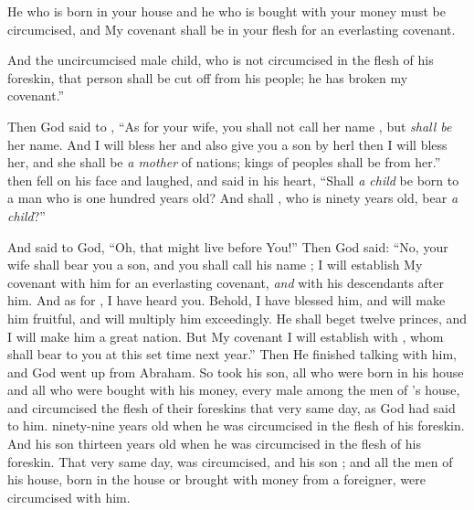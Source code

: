 \bverse He who is born in your house and he who is bought with your money must be circumcised, and My covenant shall be in your flesh for an everlasting covenant.

\bverse And the uncircumcised male child, who is not circumcised in the flesh of his foreskin, that person shall be cut off from his people; he has broken my covenant.''

\bverse Then God said to , ``As for  your wife, you shall not call her name , but  \textit{shall be} her name.
\bverse And I will bless her and also give you a son by herl then I will bless her, and she shall be \textit{a mother} of nations; kings of peoples shall be from her.''
\bverse then  fell on his face and laughed, and said in his heart, ``Shall \textit{a child} be born to a man who is one hundred years old? And shall , who is ninety years old, bear \textit{a child}?''

\bverse And  said to God, ``Oh, that  might live before You!''
\bverse Then God said: ``No,  your wife shall bear you a son, and you shall call his name ; I will establish My covenant with him for an everlasting covenant, \textit{and} with his descendants after him.
\bverse And as for , I have heard you. Behold, I have blessed him, and will make him fruitful, and will multiply him exceedingly. He shall beget twelve princes, and I will make him a great nation.
\bverse But My covenant I will establish with , whom  shall bear to you at this set time next year.''
\bverse Then He finished talking with him, and God went up from Abraham.
\bverse So  took  his son, all who were born in his house and all who were bought with his money, every male among the men of 's house, and circumcised the flesh of their foreskins that very same day, as God had said to him.
\bverse {} \was ninety-nine years old when he was circumcised in the flesh of his foreskin.
\bverse And  his son \was thirteen years old when he was circumcised in the flesh of his foreskin.
\bverse That very same day,  was circumcised, and his son ;
\bverse and all the men of his house, born in the house or brought with money from a foreigner, were circumcised with him.
